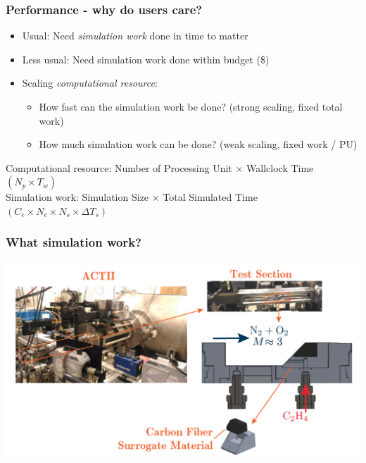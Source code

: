 \begin{frame}\frametitle{Performance - why do users care?}
\begin{multicols}{2}
\begin{itemize}
\item Usual: Need \textit{simulation work} done in time to matter
\item Less usual: Need simulation work done within budget (\$)
\columnbreak
\item Scaling \textit{computational resource}:
\begin{itemize}
\item How fast can the simulation work be done? (strong scaling, fixed total work)
\item How much simulation work can be done? (weak scaling, fixed work / PU)
\end{itemize}
\end{itemize}
\end{multicols}
\begin{center}
\vspace{10pt}
Computational resource: Number of Processing Unit $\times$ Wallclock Time $(N_p \times T_w)$\\
\vspace{10pt}
Simulation work: Simulation Size $\times$ Total Simulated Time $(C_e \times N_e \times N_s \times \Delta{T_s})$
\end{center}
\end{frame}

\begin{frame}\frametitle{What simulation work?}
\includegraphics[width=\textwidth]{figures/actii.png}
\begin{center}
\end{center}
\end{frame}


